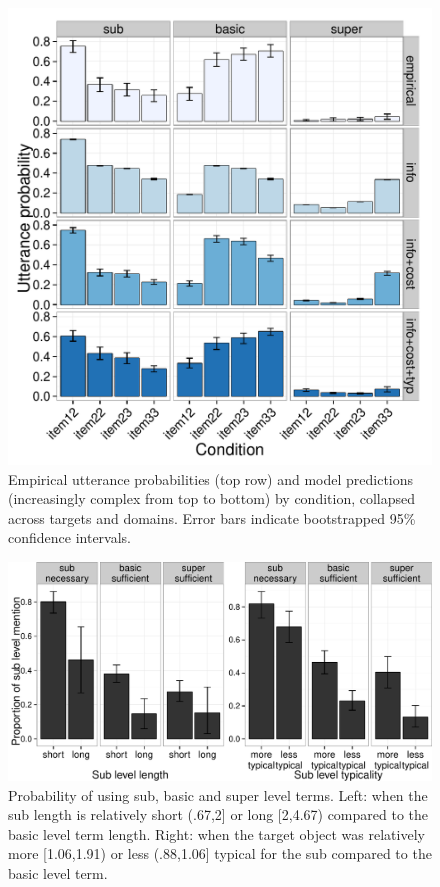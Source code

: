 \documentclass[10pt,letterpaper]{article}
\begin{document}
\begin{figure}[ht!]
\centering
\includegraphics[width=.5\textwidth]{graphs/collapsed-pattern}
\caption{Empirical utterance probabilities (top row) and model predictions (increasingly complex from top to bottom) by condition, collapsed across targets and domains. Error bars indicate bootstrapped 95\% confidence intervals.}
\label{fig:qualitativemodel}
\end{figure}

\begin{figure}[ht!]
\centering
\includegraphics[width=.5\textwidth]{graphs/length-typicality}
\caption{Probability of using sub, basic and super level terms. Left: when the sub  length is relatively short (.67,2] or long [2,4.67) compared to the basic level term length. Right: when the target object was relatively more [1.06,1.91) or less (.88,1.06] typical for the sub compared to the basic level term.}
 \label{fig:lengthtypicality}
\end{figure}


\end{document}
